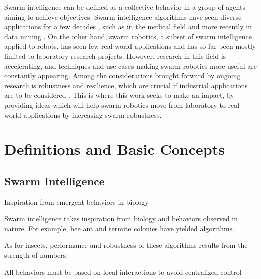 \label{sec:Introduction}  %
Swarm intelligence can be defined as a collective behavior in a group of agents aiming to achieve objectives. Swarm intelligence algorithms have seen diverse applications for a few decades \cite{lones2014metaheuristics}, such as in the medical field \cite{lewis1992behavioral, al2012identifying} and more recently in data mining \cite{martens2011editorial}. On the other hand, swarm robotics, a subset of swarm intelligence applied to robots, has seen few real-world applications and has so far been mostly limited to laboratory research projects. However, research in this field is accelerating, and techniques and use cases making swarm robotics more useful are constantly appearing. Among the considerations brought forward by ongoing research is robustness and resilience, which are crucial if industrial applications are to be considered \cite{prorok2021beyond}. This is where this work seeks to make an impact, by providing ideas which will help swarm robotics move from laboratory to real-world applications by increasing swarm robustness.

\section{Definitions and Basic Concepts}  %

\subsection{Swarm Intelligence}
Inspiration from emergent behaviors in biology

Swarm intelligence takes inspiration from biology and behaviors observed in nature. For example, bee ant and termite colonies have yielded algorithms.

As for insects, performance and robustness of these algorithms results from the strength of numbers.

All behaviors must be based on local interactions to avoid centralized control


